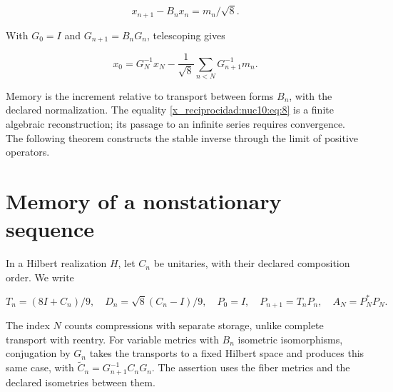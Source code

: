 \begin{equation}
x_{n+1}-B_nx_n=m_n/\sqrt8.
\label{x_reciprocidad:nuc10:eq:7}
\end{equation}



With \(G_0=I\) and \(G_{n+1}=B_nG_n\), telescoping gives



\begin{equation}
x_0=G_N^{-1}x_N-\frac1{\sqrt8}\sum_{n<N}G_{n+1}^{-1}m_n.
\label{x_reciprocidad:nuc10:eq:8}
\end{equation}



Memory is the increment relative to transport between forms \(B_n\), with the declared normalization. The equality \eqref{x_reciprocidad:nuc10:eq:8} is a finite algebraic reconstruction; its passage to an infinite series requires convergence. The following theorem constructs the stable inverse through the limit of positive operators.

\section{Memory of a nonstationary sequence}

In a Hilbert realization \(H\), let \(C_n\) be unitaries, with their declared composition order. We write



\[
T_n=(8I+C_n)/9,\quad D_n=\sqrt8(C_n-I)/9,
\quad P_0=I,\quad P_{n+1}=T_nP_n,\quad A_N=P_N^*P_N.
\]



The index \(N\) counts compressions with separate storage, unlike complete transport with reentry. For variable metrics with \(B_n\) isometric isomorphisms, conjugation by \(G_n\) takes the transports to a fixed Hilbert space and produces this same case, with \(\widetilde C_n=G_{n+1}^{-1}C_nG_n\). The assertion uses the fiber metrics and the declared isometries between them.

